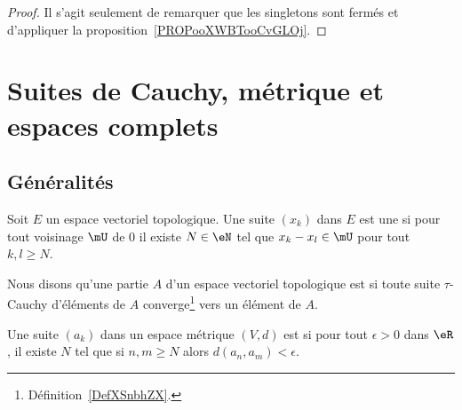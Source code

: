 \begin{proof}
	Il s'agit seulement de remarquer que les singletons sont fermés et d'appliquer la proposition~\ref{PROPooXWBTooCvGLOj}.
\end{proof}

\section{Suites de Cauchy, métrique et espaces complets}

\subsection{Généralités}

\begin{definition}   \label{DefZSnlbPc}
	Soit \( E\) un espace vectoriel topologique. Une suite \( (x_k)\) dans \( E\) est une  si pour tout voisinage \( \mU\) de \( 0\) il existe \( N\in \eN\) tel que \( x_k-x_l\in\mU\) pour tout \( k,l\geq N\).
\end{definition}

\begin{definition}      \label{DEFooVQDBooNxprFU}
	Nous disons qu'une partie \( A\) d'un espace vectoriel topologique est  si toute suite \(  \tau\)-Cauchy d'éléments de \( A\) converge\footnote{Définition~\ref{DefXSnbhZX}.} vers un élément de \( A\).
\end{definition}

\begin{definition}      \label{DEFooXOYSooSPTRTn}
    Une suite \( (a_k)\) dans un espace métrique \( (V,d)\) est  si pour tout \( \epsilon> 0\) dans \( \eR\), il existe \( N\) tel que si \( n,m\geq N\) alors \( d(a_n,a_m)<\epsilon\).
\end{definition}

